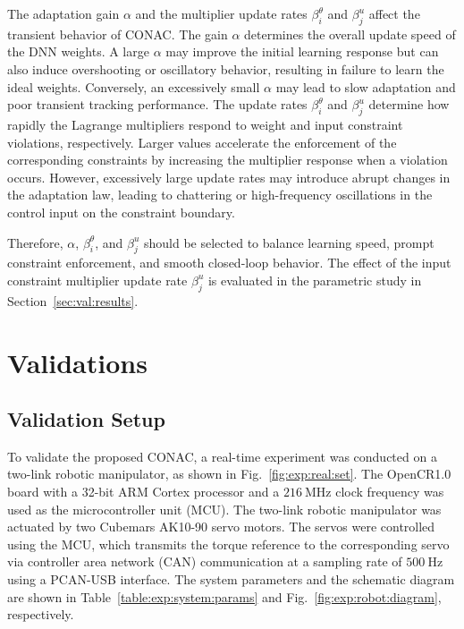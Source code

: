 \documentclass[letterpaper, journal]{IEEEtran}
\begin{document}
\begin{remark} \label{rem:tuning}
  The adaptation gain $\alpha$ and the multiplier update rates $\beta_i^\theta$ and $\beta_j^u$ affect the transient behavior of CONAC.
  The gain $\alpha$ determines the overall update speed of the DNN weights.
  A large $\alpha$ may improve the initial learning response but can also induce overshooting or oscillatory behavior, resulting in failure to learn the ideal weights.
  Conversely, an excessively small $\alpha$ may lead to slow adaptation and poor transient tracking performance.
  The update rates $\beta_i^\theta$ and $\beta_j^u$ determine how rapidly the Lagrange multipliers respond to weight and input constraint violations, respectively.
  Larger values accelerate the enforcement of the corresponding constraints by increasing the multiplier response when a violation occurs.
  However, excessively large update rates may introduce abrupt changes in the adaptation law, leading to chattering or high-frequency oscillations in the control input on the constraint boundary.

  Therefore, $\alpha$, $\beta_i^\theta$, and $\beta_j^u$ should be selected to balance learning speed, prompt constraint enforcement, and smooth closed-loop behavior.
  The effect of the input constraint multiplier update rate $\beta_j^u$ is evaluated in the parametric study in Section~\ref{sec:val:results}.
\end{remark}

\section{Validations} \label{sec:val}

\subsection{Validation Setup} \label{sec:val:setup}

To validate the proposed CONAC, a real-time experiment was conducted on a two-link robotic manipulator, as shown in Fig.~\ref{fig:exp:real:set}. 
The OpenCR1.0 board \cite{opencr} with a 32-bit ARM Cortex processor and a $\qty{216}{\mega\hertz}$ clock frequency was used as the microcontroller unit (MCU).
The two-link robotic manipulator was actuated by two Cubemars AK10-90 servo motors.
The servos were controlled using the MCU, which transmits the torque reference to the corresponding servo via controller area network (CAN) communication at a sampling rate of $\qty{500}{\hertz}$ using a PCAN-USB interface.
The system parameters and the schematic diagram are shown in Table~\ref{table:exp:system:params} and Fig.~\ref{fig:exp:robot:diagram}, respectively.
\end{document}
